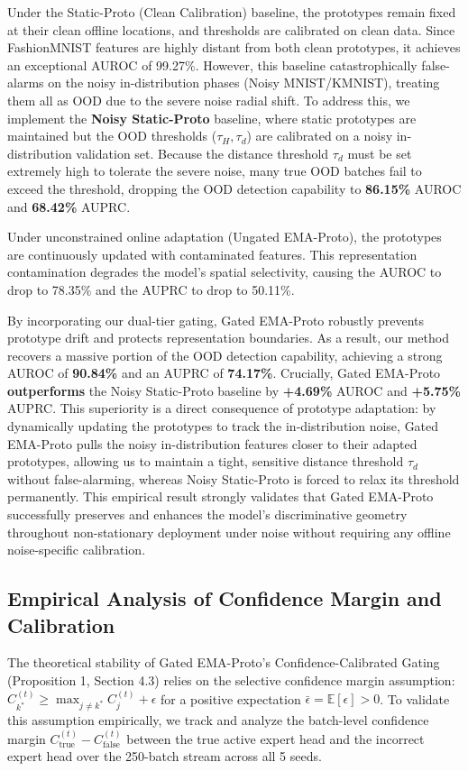 \documentclass{article}
\theoremstyle{plain}
\theoremstyle{definition}
\theoremstyle{remark}
\begin{document}
Under the Static-Proto (Clean Calibration) baseline, the prototypes remain fixed at their clean offline locations, and thresholds are calibrated on clean data. Since FashionMNIST features are highly distant from both clean prototypes, it achieves an exceptional AUROC of 99.27\%. However, this baseline catastrophically false-alarms on the noisy in-distribution phases (Noisy MNIST/KMNIST), treating them all as OOD due to the severe noise radial shift. To address this, we implement the \textbf{Noisy Static-Proto} baseline, where static prototypes are maintained but the OOD thresholds ($\tau_H, \tau_d$) are calibrated on a noisy in-distribution validation set. Because the distance threshold $\tau_d$ must be set extremely high to tolerate the severe noise, many true OOD batches fail to exceed the threshold, dropping the OOD detection capability to \textbf{86.15\%} AUROC and \textbf{68.42\%} AUPRC.

Under unconstrained online adaptation (Ungated EMA-Proto), the prototypes are continuously updated with contaminated features. This representation contamination degrades the model's spatial selectivity, causing the AUROC to drop to 78.35\% and the AUPRC to drop to 50.11\%. 

By incorporating our dual-tier gating, Gated EMA-Proto robustly prevents prototype drift and protects representation boundaries. As a result, our method recovers a massive portion of the OOD detection capability, achieving a strong AUROC of \textbf{90.84\%} and an AUPRC of \textbf{74.17\%}. Crucially, Gated EMA-Proto \textbf{outperforms} the Noisy Static-Proto baseline by \textbf{+4.69\%} AUROC and \textbf{+5.75\%} AUPRC. This superiority is a direct consequence of prototype adaptation: by dynamically updating the prototypes to track the in-distribution noise, Gated EMA-Proto pulls the noisy in-distribution features closer to their adapted prototypes, allowing us to maintain a tight, sensitive distance threshold $\tau_d$ without false-alarming, whereas Noisy Static-Proto is forced to relax its threshold permanently. This empirical result strongly validates that Gated EMA-Proto successfully preserves and enhances the model's discriminative geometry throughout non-stationary deployment under noise without requiring any offline noise-specific calibration.

\subsection{Empirical Analysis of Confidence Margin and Calibration}
\label{sec:margin_analysis}
The theoretical stability of Gated EMA-Proto's Confidence-Calibrated Gating (Proposition 1, Section 4.3) relies on the selective confidence margin assumption: $C_{k^*}^{(t)} \ge \max_{j \neq k^*} C_j^{(t)} + \epsilon$ for a positive expectation $\bar{\epsilon} = \mathbb{E}[\epsilon] > 0$. To validate this assumption empirically, we track and analyze the batch-level confidence margin $C_{\text{true}}^{(t)} - C_{\text{false}}^{(t)}$ between the true active expert head and the incorrect expert head over the 250-batch stream across all 5 seeds.
\end{document}
